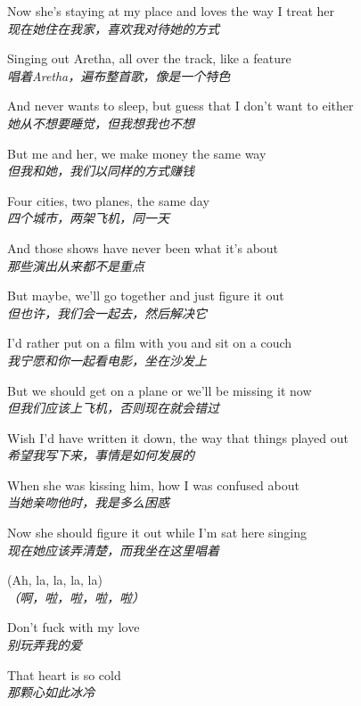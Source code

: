 \begin{spacing}{1.5}
\begin{flushleft}
Now she's staying at my place and loves the way I treat her\\
\textit{现在她住在我家，喜欢我对待她的方式}\lyricspace

Singing out Aretha, all over the track, like a feature\\
\textit{唱着Aretha，遍布整首歌，像是一个特色}\lyricspace

And never wants to sleep, but guess that I don't want to either\\
\textit{她从不想要睡觉，但我想我也不想}\lyricspace

But me and her, we make money the same way\\
\textit{但我和她，我们以同样的方式赚钱}\lyricspace

Four cities, two planes, the same day\\
\textit{四个城市，两架飞机，同一天}\lyricspace

And those shows have never been what it's about\\
\textit{那些演出从来都不是重点}\lyricspace

But maybe, we'll go together and just figure it out\\
\textit{但也许，我们会一起去，然后解决它}\lyricspace

I'd rather put on a film with you and sit on a couch\\
\textit{我宁愿和你一起看电影，坐在沙发上}\lyricspace

But we should get on a plane or we'll be missing it now\\
\textit{但我们应该上飞机，否则现在就会错过}\lyricspace

Wish I'd have written it down, the way that things played out\\
\textit{希望我写下来，事情是如何发展的}\lyricspace

When she was kissing him, how I was confused about\\
\textit{当她亲吻他时，我是多么困惑}\lyricspace

Now she should figure it out while I'm sat here singing\\
\textit{现在她应该弄清楚，而我坐在这里唱着}\lyricspace

(Ah, la, la, la, la)\\
\textit{（啊，啦，啦，啦，啦）}\lyricspace

Don't fuck with my love\\
\textit{别玩弄我的爱}\lyricspace

That heart is so cold\\
\textit{那颗心如此冰冷}\lyricspace


\end{flushleft}
\end{spacing}
